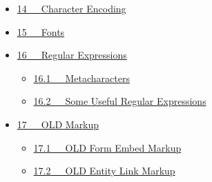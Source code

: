 \documentclass[letterpaper,10pt,english]{sphinxmanual}
\begin{document}
{\begin{minipage}{0.95\linewidth}
\begin{itemize}
\begin{itemize}
\item {} 
{\hyperref[user_guide:object-language-data]{13.4   Object Language Data}}
\begin{itemize}
\item {} 
{\hyperref[user_guide:pure-object-language-fields]{13.4.1   Pure Object Language Fields}}

\item {} 
{\hyperref[user_guide:optionally-object-language-fields]{13.4.2   Optionally Object Language Fields}}

\item {} 
{\hyperref[user_guide:object-language-tag-fields]{13.4.3   Object Language Tag Fields}}

\end{itemize}

\item {} 
{\hyperref[user_guide:testing-orthography-conversion]{13.5   Testing Orthography Conversion}}

\item {} 
{\hyperref[user_guide:metalanguage]{13.6   Metalanguage}}

\end{itemize}

\item {} 
{\hyperref[user_guide:character-encoding]{14   Character Encoding}}

\item {} 
{\hyperref[user_guide:fonts]{15   Fonts}}

\item {} 
{\hyperref[user_guide:regular-expressions]{16   Regular Expressions}}
\begin{itemize}
\item {} 
{\hyperref[user_guide:metacharacters]{16.1   Metacharacters}}

\item {} 
{\hyperref[user_guide:some-useful-regular-expressions]{16.2   Some Useful Regular Expressions}}

\end{itemize}

\item {} 
{\hyperref[user_guide:old-markup]{17   OLD Markup}}
\begin{itemize}
\item {} 
{\hyperref[user_guide:old-form-embed-markup]{17.1   OLD Form Embed Markup}}

\item {} 
{\hyperref[user_guide:old-entity-link-markup]{17.2   OLD Entity Link Markup}}


\end{itemize}
\end{itemize}
\end{minipage}}
\end{document}
